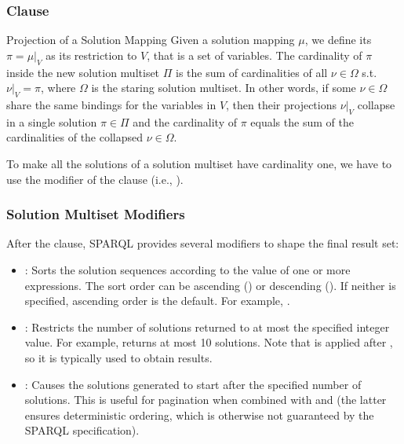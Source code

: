 \subsubsection{ Clause}
\begin{definition}{Projection of a Solution Mapping}
    Given a solution mapping \(\mu\), we define its  \(\pi=\mu|_{V}\) as its restriction to \(V\), that is a set of variables.
    The cardinality of \(\pi\) inside the new solution multiset \(\Pi\) is the sum of cardinalities of all \(\nu\in\Omega\) s.t. \(\nu|_{V}=\pi\), where \(\Omega\) is the staring solution multiset.
    In other words, if some \(\nu\in\Omega\) share the same bindings for the variables in \(V\), then their projections \(\nu|_{V}\) collapse in a single solution \(\pi\in\Pi\) and the cardinality of \(\pi\) equals the sum of the cardinalities of the collapsed \(\nu\in\Omega\). 
\end{definition}

\noindent
To make all the solutions of a solution multiset have cardinality one, we have to use the  modifier of the  clause (i.e., ).

\subsubsection{Solution Multiset Modifiers}
After the  clause, SPARQL provides several modifiers to shape the final result set:

\begin{itemize}
    \item {}: Sorts the solution sequences according to the value of one or more expressions. The sort order can be ascending () or descending (). If neither is specified, ascending order is the default. For example, .
    
    \item {}: Restricts the number of solutions returned to at most the specified integer value. For example,  returns at most 10 solutions. Note that  is applied after , so it is typically used to obtain  results.
    
    \item {}: Causes the solutions generated to start after the specified number of solutions. This is useful for pagination when combined with  and  (the latter ensures deterministic ordering, which is otherwise not guaranteed by the SPARQL specification).
\end{itemize}

